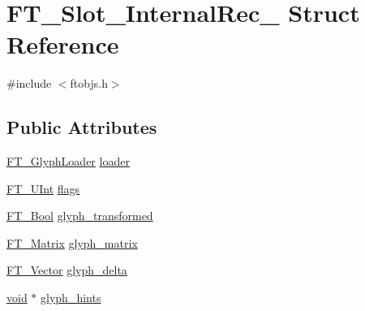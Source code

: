 \hypertarget{struct_f_t___slot___internal_rec__}{\section{F\-T\-\_\-\-Slot\-\_\-\-Internal\-Rec\-\_\- Struct Reference}
\label{struct_f_t___slot___internal_rec__}
}


{\ttfamily \#include $<$ftobjs.\-h$>$}

\subsection*{Public Attributes}
\begin{DoxyCompactItemize}
\item 
\hyperlink{ftgloadr_8h_a2671bcb107327e81037ea42332454741}{F\-T\-\_\-\-Glyph\-Loader} \hyperlink{struct_f_t___slot___internal_rec___ac57f8c939f667938ab9f986088c15d8f}{loader}
\item 
\hyperlink{fttypes_8h_abcb8db4dbf35d2b55a9e8c7b0926dc52}{F\-T\-\_\-\-U\-Int} \hyperlink{struct_f_t___slot___internal_rec___a9a2a287ba2b363197b36fe24d2f48746}{flags}
\item 
\hyperlink{fttypes_8h_a1a832a256bb5a7e6e884afaa1a07f3ae}{F\-T\-\_\-\-Bool} \hyperlink{struct_f_t___slot___internal_rec___ac2bba891ac70016b74c085a05c1f182c}{glyph\-\_\-transformed}
\item 
\hyperlink{fttypes_8h_afeacbc4365cf2ad77162b6292f3e3e23}{F\-T\-\_\-\-Matrix} \hyperlink{struct_f_t___slot___internal_rec___a95af217daf1c2080692b5a69e345aa3b}{glyph\-\_\-matrix}
\item 
\hyperlink{ftimage_8h_ab158b5a7e422acb1968af95db786d018}{F\-T\-\_\-\-Vector} \hyperlink{struct_f_t___slot___internal_rec___a2a94b955dd1e260aaf8699238d44769d}{glyph\-\_\-delta}
\item 
\hyperlink{wglew_8h_aeea6e3dfae3acf232096f57d2d57f084}{void} $\ast$ \hyperlink{struct_f_t___slot___internal_rec___a16337853823cdccfb0c636673c4eb3ae}{glyph\-\_\-hints}
\end{DoxyCompactItemize}


